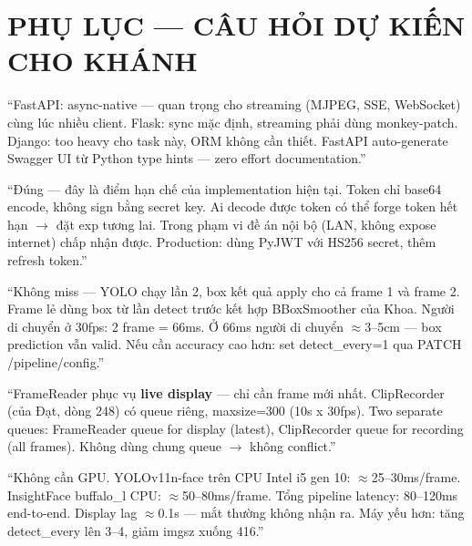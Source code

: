 \documentclass[12pt, a4paper]{article}
\begin{document}
\section{PHỤ LỤC --- CÂU HỎI DỰ KIẾN CHO KHÁNH}

\begin{tcolorbox}[colback=gray!5, colframe=MidnightBlue!70, breakable,
  title={\textbf{Q: Tại sao FastAPI chứ không Flask hay Django?}}]
``FastAPI: async-native --- quan trọng cho streaming (MJPEG, SSE, WebSocket) cùng lúc nhiều client.
Flask: sync mặc định, streaming phải dùng monkey-patch.
Django: too heavy cho task này, ORM không cần thiết.
FastAPI auto-generate Swagger UI từ Python type hints --- zero effort documentation.''
\end{tcolorbox}

\begin{tcolorbox}[colback=gray!5, colframe=MidnightBlue!70, breakable,
  title={\textbf{Q: JWT token base64 không phải signed --- có an toàn không?}}]
``Đúng --- đây là điểm hạn chế của implementation hiện tại.
Token chỉ base64 encode, không sign bằng secret key.
Ai decode được token có thể forge token hết hạn $\to$ đặt exp tương lai.
Trong phạm vi đề án nội bộ (LAN, không expose internet) chấp nhận được.
Production: dùng PyJWT với HS256 secret, thêm refresh token.''
\end{tcolorbox}

\begin{tcolorbox}[colback=gray!5, colframe=MidnightBlue!70, breakable,
  title={\textbf{Q: detect\_every=2 có làm miss khuôn mặt không?}}]
``Không miss --- YOLO chạy lần 2, box kết quả apply cho cả frame 1 và frame 2.
Frame lẻ dùng box từ lần detect trước kết hợp BBoxSmoother của Khoa.
Người di chuyển ở 30fps: 2 frame = 66ms.
Ở 66ms người di chuyển $\approx$3--5cm --- box prediction vẫn valid.
Nếu cần accuracy cao hơn: set detect\_every=1 qua PATCH /pipeline/config.''
\end{tcolorbox}

\begin{tcolorbox}[colback=gray!5, colframe=MidnightBlue!70, breakable,
  title={\textbf{Q: FrameReader Queue(maxsize=1) có bị mất frame clip không?}}]
``FrameReader phục vụ \textbf{live display} --- chỉ cần frame mới nhất.
ClipRecorder (của Đạt, dòng 248) có queue riêng, maxsize=300 (10s x 30fps).
Two separate queues: FrameReader queue for display (latest), ClipRecorder queue for recording (all frames).
Không dùng chung queue $\to$ không conflict.''
\end{tcolorbox}

\begin{tcolorbox}[colback=gray!5, colframe=MidnightBlue!70, breakable,
  title={\textbf{Q: Làm sao chạy thực tế? Cần GPU không?}}]
``Không cần GPU.
YOLOv11n-face trên CPU Intel i5 gen 10: $\approx$25--30ms/frame.
InsightFace buffalo\_l CPU: $\approx$50--80ms/frame.
Tổng pipeline latency: 80--120ms end-to-end.
Display lag $\approx$0.1s --- mắt thường không nhận ra.
Máy yếu hơn: tăng detect\_every lên 3--4, giảm imgsz xuống 416.''
\end{tcolorbox}
\end{document}
